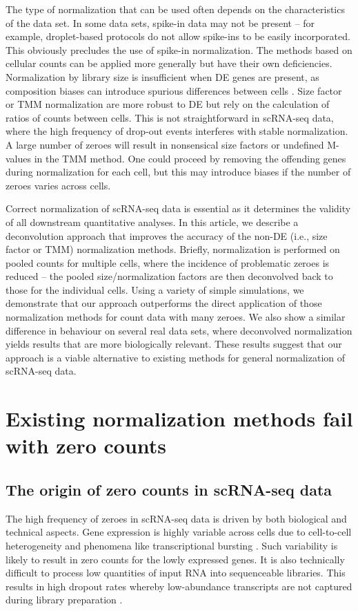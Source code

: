 \documentclass{article}
\begin{document}
The type of normalization that can be used often depends on the characteristics of the data set.
In some data sets, spike-in data may not be present -- for example, droplet-based protocols \cite{klein2015droplet,macosko2015highly} do not allow spike-ins to be easily incorporated.
This obviously precludes the use of spike-in normalization.
The methods based on cellular counts can be applied more generally but have their own deficiencies.
Normalization by library size is insufficient when DE genes are present, as composition biases can introduce spurious differences between cells \cite{robinson2010scaling}.
Size factor or TMM normalization are more robust to DE but rely on the calculation of ratios of counts between cells.
This is not straightforward in scRNA-seq data, where the high frequency of drop-out events interferes with stable normalization.
A large number of zeroes will result in nonsensical size factors or undefined M-values in the TMM method.
One could proceed by removing the offending genes during normalization for each cell, but this may introduce biases if the number of zeroes varies across cells.

Correct normalization of scRNA-seq data is essential as it determines the validity of all downstream quantitative analyses.
In this article, we describe a deconvolution approach that improves the accuracy of the non-DE (i.e., size factor or TMM) normalization methods.
Briefly, normalization is performed on pooled counts for multiple cells, where the incidence of problematic zeroes is reduced
    -- the pooled size/normalization factors are then deconvolved back to those for the individual cells.
Using a variety of simple simulations, we demonstrate that our approach outperforms the direct application of those normalization methods for count data with many zeroes.
We also show a similar difference in behaviour on several real data sets, where deconvolved normalization yields results that are more biologically relevant.
These results suggest that our approach is a viable alternative to existing methods for general normalization of scRNA-seq data.

\section{Existing normalization methods fail with zero counts}

\subsection{The origin of zero counts in scRNA-seq data}
The high frequency of zeroes in scRNA-seq data is driven by both biological and technical aspects.
Gene expression is highly variable across cells due to cell-to-cell heterogeneity and phenomena like transcriptional bursting \cite{marinov2014singlecell}.
Such variability is likely to result in zero counts for the lowly expressed genes.
It is also technically difficult to process low quantities of input RNA into sequenceable libraries.
This results in high dropout rates whereby low-abundance transcripts are not captured during library preparation \cite{brennecke2013accounting}.
\end{document}
